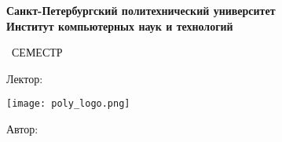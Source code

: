 
\begin{titlepage}
	\clearpage\thispagestyle{empty}
	\centering
	
	\textbf{Санкт-Петербургский политехнический университет\\Институт компьютерных
	наук и технологий}
	\vspace{33ex}
	
	{\textbf{\FullCourseNameFirstPart}}
	
	\SemesterNumber\ СЕМЕСТР  
	\vspace{1ex}
	
	Лектор: \textit{\LecturerInitials}
	
	\texttt{[image: poly\_logo.png]}

	\begin{flushright}
		\noindent
		Автор: \textit{\AuthorInitials}
		\\
	\end{flushright}
	
	\vfill
	\CourseDate
	\pagebreak
\end{titlepage}
